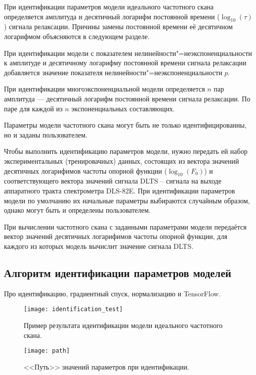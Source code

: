 	При идентификации параметров модели идеального частотного скана 
	определяется амплитуда и десятичный логарифм постоянной времени 
	($\log_{10}(\tau)$) сигнала релаксации. Причины замены постоянной времени
	её десятичном логарифмом объясняются в следующем разделе.

	При идентификации модели с показателем нелинейности"=неэкспоненциальности
	к амплитуде и десятичному логарифму постоянной времени сигнала релаксации
	добавляется значение показателя нелинейности"=неэкспоненциальности $p$.

	При идентификации многоэкспоненциальной модели определяется $n$ пар 
	амплитуда --- десятичный логарифм постоянной времени сигнала релаксации. 
	По паре для каждой из $n$ экспоненциальных составляющих.

	Параметры модели частотного скана могут быть не только идентифицированны,
	но и заданы пользователем.

	Чтобы выполнить идентификацию параметров модели, нужно передать ей 
	набор экспериментальных (тренировачных) данных, состоящих из вектора 
	значений десятичных логарифимов частоты опорной функции ($\log_{10}(F_0)$)
	и соответствующего вектора значений сигнала DLTS -- сигнала на выходе 
	аппаратного тракта спектрометра DLS-82E. При идентификации параметров модели
	по умолчанию их начальные параметры выбираются случайным образом, однако
	могут быть и определены пользователем.

	При вычислении частотного скана с заданными параметрами модели передаётся
	вектор значений десятичных логарифимов частоты опорной функции, для каждого 
	из которых модель вычислит значение сигнала	DLTS.


	\subsection{Алгоритм идентификации параметров моделей}

	Про идентификацию, градиентный спуск, нормализацию и TensorFlow.

    \begin{figure}[!ht]
        \centering
        \texttt{[image: identification\_test]}
        \caption{Пример результата идентификации модели идеального частотного 
        скана.}
        \label{pic:identification_test}
    \end{figure}


    \begin{figure}[!ht]
        \centering
        \texttt{[image: path]}
        \caption{<<Путь>> значений параметров при идентификации.}
        \label{pic:path}
    \end{figure}


